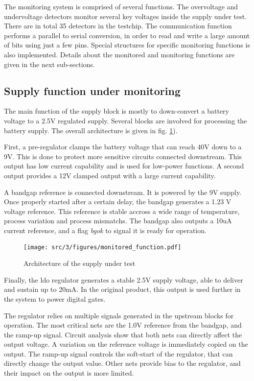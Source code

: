 The monitoring system is comprised of several functions.
The overvoltage and undervoltage detectors monitor several key voltages inside the supply under test.
There are in total 35 detectors in the testchip.
The communication function performs a parallel to serial conversion, in order to read and write a large amount of bits using just a few pins.
Special structures for specific monitoring functions is also implemented.
Details about the monitored and monitoring functions are given in the next sub-sections.

\subsection{Supply function under monitoring}

The main function of the supply block is mostly to down-convert a battery voltage to a 2.5V regulated supply.
Several blocks are involved for processing the battery supply.
The overall architecture is given in fig. \ref{fig:monitored_function}).

First, a pre-regulator clamps the battery voltage that can reach 40V down to a 9V.
This is done to protect more sensitive circuits connected downstream.
This output has low current capability and is used for low-power functions.
A second output provides a 12V clamped output with a large current capability.

A bandgap reference is connected downstream.
It is powered by the 9V supply.
Once properly started after a certain delay, the bandgap generates a 1.23 V voltage reference.
This reference is stable accross a wide range of temperature, process variation and process mismatchs.
The bandgap also outputs a 10uA current reference, and a flag \textit{bgok} to signal it is ready for operation.

\begin{figure}[!htbp]
  \centering
  \texttt{[image: src/3/figures/monitored\_function.pdf]}
  \caption{Architecture of the supply under test}
  \label{fig:monitored_function}
\end{figure}

Finally, the \gls{ldo} regulator generates a stable 2.5V supply voltage, able to deliver and sustain up to 20mA.
In the original product, this output is used further in the system to power digital gates.

The regulator relies on multiple signals generated in the upstream blocks for operation.
The most critical nets are the 1.0V reference from the bandgap, and the ramp-up signal.
Circuit analysis show that both nets can directly affect the output voltage.
A variation on the reference voltage is immediately copied on the output.
The ramp-up signal controls the soft-start of the regulator, that can directly change the output value.
Other nets provide bias to the regulator, and their impact on the output is more limited.

